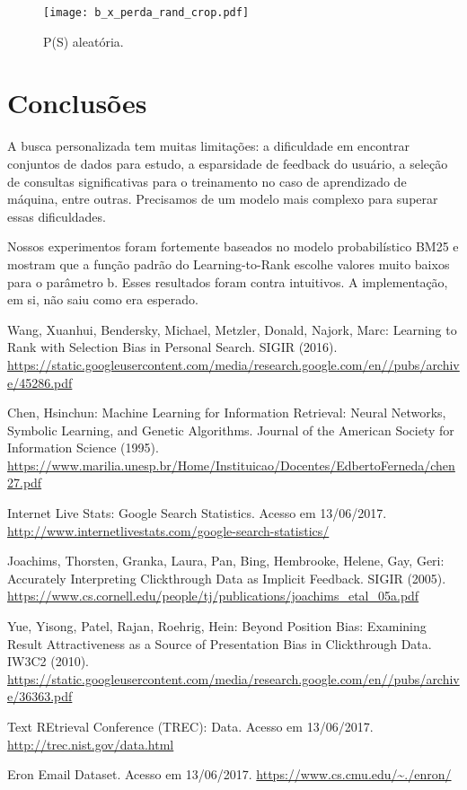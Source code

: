 \documentclass{svproc}
\begin{document}
\begin{figure}[ht]
  \caption{P(S) aleatória.}
  \label{graf:rand}
  \centering
  \texttt{[image: b\_x\_perda\_rand\_crop.pdf]}
\end{figure}

\pagebreak


\section{Conclusões}
A busca personalizada tem muitas limitações: a dificuldade em encontrar conjuntos de dados para estudo, a
esparsidade de feedback do usuário, a seleção de consultas significativas para o treinamento no caso de aprendizado
de máquina, entre outras. Precisamos de um modelo mais complexo para superar essas dificuldades.

Nossos experimentos foram fortemente baseados no modelo probabilístico BM25 e mostram que a função padrão do Learning-to-Rank
escolhe valores muito baixos para o parâmetro b. Esses resultados foram contra intuitivos. A implementação, em si, não 
saiu como era esperado.


\begin{thebibliography}{6}
%

Wang, Xuanhui, Bendersky, Michael, Metzler, Donald, Najork, Marc: Learning to Rank with Selection Bias in Personal Search.
SIGIR (2016). \url{https://static.googleusercontent.com/media/research.google.com/en//pubs/archive/45286.pdf}

Chen, Hsinchun: Machine Learning for Information Retrieval: Neural Networks, Symbolic Learning, and Genetic Algorithms.
Journal of the American Society for Information Science (1995). \url{https://www.marilia.unesp.br/Home/Instituicao/Docentes/EdbertoFerneda/chen27.pdf}

Internet Live Stats: Google Search Statistics.
Acesso em 13/06/2017. \url{http://www.internetlivestats.com/google-search-statistics/}

Joachims, Thorsten, Granka, Laura, Pan, Bing, Hembrooke, Helene, Gay, Geri: Accurately Interpreting Clickthrough Data as Implicit
Feedback.
SIGIR (2005). \url{https://www.cs.cornell.edu/people/tj/publications/joachims_etal_05a.pdf}

Yue, Yisong, Patel, Rajan, Roehrig, Hein: Beyond Position Bias: Examining Result Attractiveness as
a Source of Presentation Bias in Clickthrough Data.
IW3C2 (2010). \url{https://static.googleusercontent.com/media/research.google.com/en//pubs/archive/36363.pdf}

Text REtrieval Conference (TREC): Data.
Acesso em 13/06/2017. \url{http://trec.nist.gov/data.html}

Eron Email Dataset.
Acesso em 13/06/2017. \url{https://www.cs.cmu.edu/~./enron/}

\end{thebibliography}
\end{document}
